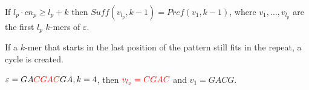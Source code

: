 \begin{theorem}
    If $l_p\cdot cn_p\geq l_p+k$ then $Suff(v_{l_p},k-1)=Pref(v_1,k-1)$, where $v_1,\dots,v_{l_p}$ are the first $l_p$ $k$-mers of $\varepsilon$.
\end{theorem}
\begin{remarkth}
    If a $k$-mer that starts in the last position of the pattern still fits in the repeat, a cycle is created.
\end{remarkth}
\begin{example}
    $\varepsilon=GA\textcolor{red}{CGAC}GA,k=4$, then $\textcolor{red}{v_{l_p} = CGAC}$ and $v_1=GACG$.
\end{example}



\newpage